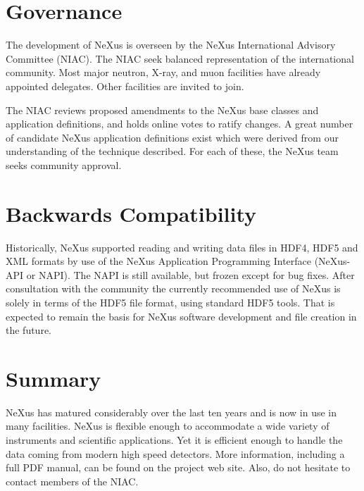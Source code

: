 \documentclass[%
 aip,
rsi,
 amsmath,amssymb,
 reprint,%
]{revtex4-1}
\begin{document}
\section{Governance}
  \label{sect_gov}

The development of NeXus is overseen
by the NeXus International Advisory Committee (NIAC).
The NIAC seek balanced representation of the international community.
Most major neutron, X-ray, and muon facilities have already appointed delegates.
Other facilities are invited to join.

The NIAC reviews proposed amendments to the NeXus base classes and
application definitions, and holds online votes to ratify changes.
A great number of candidate NeXus application definitions exist which were derived from our understanding of the technique described.
For each of these, the NeXus team seeks community approval. 


\section{Backwards Compatibility}

Historically, NeXus supported reading and writing data files in HDF4, HDF5 and
XML formats by use of the NeXus Application Programming Interface
(NeXus-API or NAPI).  The NAPI is still available, but frozen except for bug fixes.
After consultation with the community the currently recommended use of
NeXus is solely in terms of the HDF5 file format, using standard HDF5 tools.
That is expected to remain the basis for NeXus software development and
file creation in the future.

\section{Summary}

NeXus has matured considerably over the last ten years and is now in use in many facilities. NeXus 
is flexible enough to accommodate a wide variety of instruments and scientific applications. 
Yet it is efficient enough to 
handle the data coming from modern high speed detectors.
More information, including a full PDF manual, can be found on
the project web site.\cite{nxwww}
Also, do not hesitate to contact members of the NIAC.


\nocite{*}
\end{document}
